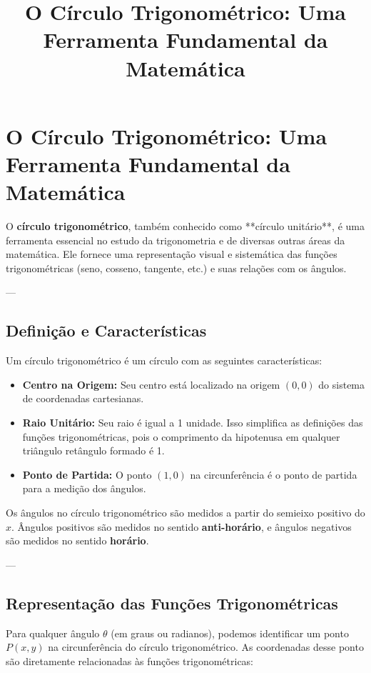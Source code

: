 \documentclass{article}
\title{O Círculo Trigonométrico: Uma Ferramenta Fundamental da Matemática}
\author{} %
\date{} %
\begin{document}
\maketitle

\section*{O Círculo Trigonométrico: Uma Ferramenta Fundamental da Matemática}

O \textbf{círculo trigonométrico}, também conhecido como **círculo unitário**, é uma ferramenta essencial no estudo da trigonometria e de diversas outras áreas da matemática. Ele fornece uma representação visual e sistemática das funções trigonométricas (seno, cosseno, tangente, etc.) e suas relações com os ângulos.

---

\subsection*{Definição e Características}

Um círculo trigonométrico é um círculo com as seguintes características:

\begin{itemize}
    \item \textbf{Centro na Origem:} Seu centro está localizado na origem $(0,0)$ do sistema de coordenadas cartesianas.
    \item \textbf{Raio Unitário:} Seu raio é igual a 1 unidade. Isso simplifica as definições das funções trigonométricas, pois o comprimento da hipotenusa em qualquer triângulo retângulo formado é 1.
    \item \textbf{Ponto de Partida:} O ponto $(1,0)$ na circunferência é o ponto de partida para a medição dos ângulos.
\end{itemize}

Os ângulos no círculo trigonométrico são medidos a partir do semieixo positivo do $x$. Ângulos positivos são medidos no sentido \textbf{anti-horário}, e ângulos negativos são medidos no sentido \textbf{horário}.

---

\subsection*{Representação das Funções Trigonométricas}

Para qualquer ângulo $\theta$ (em graus ou radianos), podemos identificar um ponto $P(x,y)$ na circunferência do círculo trigonométrico. As coordenadas desse ponto são diretamente relacionadas às funções trigonométricas:
\end{document}
